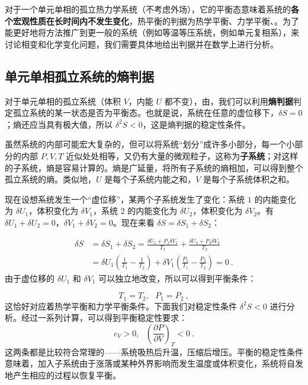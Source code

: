 
对于一个单元单相的孤立热力学系统（不考虑外场），它的平衡态意味着系统的\textbf{各个宏观性质在长时间内不发生变化}，热平衡的判据为热学平衡、力学平衡、。为了能更好地将方法推广到更一般的系统（例如等温等压系统，例如单元复相系），来讨论相变和化学变化问题，我们需要具体地给出判据并在数学上进行分析。

\subsection{单元单相孤立系统的熵判据}

对于单元单相的孤立系统（体积 $V$，内能 $U$ 都不变），由，我们可以利用\textbf{熵判据}判定孤立系统的某一状态是否为平衡态。也就是说，系统在任意的虚位移下，$\delta S=0$；熵还应当具有极大值，所以 $\delta^2S<0$，这是熵判据的稳定性条件。

虽然系统的内部可能宏大复杂的，但可以将系统“划分”成许多小部分，每一个小部分的内部 $P,V,T$ 近似处处相等，又仍有大量的微观粒子，这称为\textbf{子系统}；对这样的子系统，熵是容易计算的。熵是广延量，将所有子系统的熵相加，可以得到整个孤立系统的熵。类似地，$U$ 是每个子系统内能之和，$V$ 是每个子系统体积之和。

现在设想系统发生一个“虚位移”，某两个子系统发生了变化：系统 $1$ 的内能变化为 $\delta U_1$，体积变化为 $\delta V_1$，系统 $2$ 的内能变化为 $\delta U_2$，体积变化为 $\delta V_2$。有 $\delta U_1+\delta U_2=0$，$\delta V_1+\delta V_2=0$。现在来看 $\delta S=\delta S_1+\delta S_2$：

\begin{align}
\delta S&=\delta S_1+\delta S_2=\frac{\delta U_1+P_1\delta V_1}{T_1}+\frac{\delta U_2+P_2\delta V_2}{T_2}
\\
&=\delta U_1\left(\frac{1}{T_1}-\frac{1}{T_2}\right)
+\delta V_1\left(\frac{P_1}{T_1}-\frac{P_2}{T_2}\right)=0~.
\end{align}
由于虚位移的 $\delta U_1$ 和 $\delta V_1$ 可以独立地改变，所以可以得到平衡条件：

\begin{equation}
T_1=T_2,\ \ \ P_1=P_2~,
\end{equation}
这恰好对应着热学平衡和力学平衡条件。下面我们对稳定性条件 $\delta^2 S<0$ 进行分析。经过一系列计算，可以得到平衡稳定性要求：
\begin{equation}
c_V>0,\ \ \ \left(\frac{\partial P}{\partial V}\right)_T<0~.
\end{equation}
这两条都是比较符合常理的——系统吸热后升温，压缩后增压。平衡的稳定性条件意味着，加入子系统由于涨落或某种外界影响而发生温度或体积变化，系统将自发地产生相应的过程以恢复平衡。

